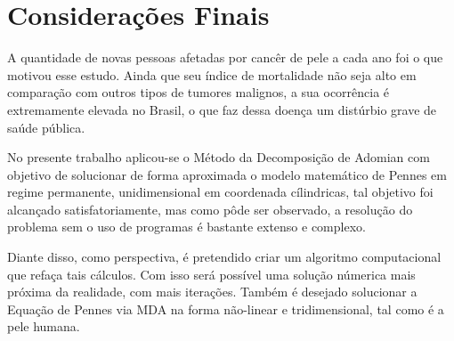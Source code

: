 
\chapter{Considerações Finais}


A quantidade de novas pessoas afetadas por cancêr de pele a cada ano foi o que motivou esse estudo. Ainda que seu índice de mortalidade não seja alto em comparação com outros tipos de tumores malignos, a sua ocorrência é extremamente elevada no Brasil, o que faz dessa doença um distúrbio grave de saúde pública.

No presente trabalho aplicou-se o Método da Decomposição de Adomian com objetivo de solucionar de forma aproximada o modelo matemático de Pennes em regime permanente, unidimensional em coordenada cílindricas, tal objetivo foi alcançado satisfatoriamente, mas como pôde ser observado, a resolução do problema sem o uso de programas é bastante extenso e  complexo. 

Diante disso, como perspectiva, é pretendido criar um algoritmo computacional  que refaça tais cálculos. Com isso será possível uma solução númerica mais próxima da realidade, com mais iterações. Também é desejado solucionar a Equação de Pennes via MDA na forma não-linear e tridimensional, tal como é a pele humana. 
